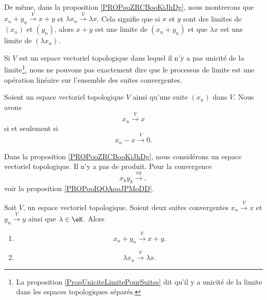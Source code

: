 De même, dans la proposition \ref{PROPooZRCBooKiJhDg}, nous montrerons que \( x_n+y_n\stackrel{V}{\longrightarrow}x+y\) et \( \lambda x_n\stackrel{ V}{\longrightarrow}\lambda x\). Cela signifie que si \( x\) et \( y\) sont des limites de \( (x_n)\) et \( (y_n)\), alors \( x+y\) est une limite de \( (x_n+y_n)\) et que \( \lambda x\) est une limite de \( (\lambda x_n)\).

Si \( V\) est un espace vectoriel topologique dans lequel il n'y a pas unicité de la limite\footnote{La proposition \ref{PropUniciteLimitePourSuites} dit qu'il y a unicité de la limite dans les espaces topologiques séparés.}, nous ne pouvons pas exactement dire que le processus de limite est une opération linéaire sur l'ensemble des suites convergentes.

\begin{lemma}       \label{LEMooJDJVooHUKdSe}
	Soient un espace vectoriel topologique \( V\) ainsi qu'une suite \( (x_n)\) dans \( V\). Nous avons
	\begin{equation}
		x_n\stackrel{V}{\longrightarrow}x
	\end{equation}
	si et seulement si
	\begin{equation}
		x_n-x\stackrel{V}{\longrightarrow}0.
	\end{equation}
\end{lemma}

Dans la proposition \ref{PROPooZRCBooKiJhDg}, nous considérons un espace vectoriel topologique. Il n'y a pas de produit. Pour la convergence
\begin{equation}
	x_ky_k\stackrel{ xy}{\longrightarrow},
\end{equation}
voir la proposition \ref{PROPooIQOAooJPMoDD}.

\begin{proposition}        \label{PROPooZRCBooKiJhDg}
	Soit \( V\), un espace vectoriel topologique. Soient deux suites convergentes \( x_n\stackrel{V}{\longrightarrow}x\) et \( y_n\stackrel{V}{\longrightarrow}y\) ainsi que \( \lambda\in \eK\). Alors
	\begin{enumerate}
		\item       \label{ITEMooSHPAooQyEkgT}
		      \begin{equation}
			      x_n+y_n\stackrel{V}{\longrightarrow}x+y.
		      \end{equation}
		\item   \label{ITEMooYHHYooYATzWE}
		      \begin{equation}
			      \lambda x_n\stackrel{V}{\longrightarrow}\lambda x.
		      \end{equation}
	\end{enumerate}
\end{proposition}

